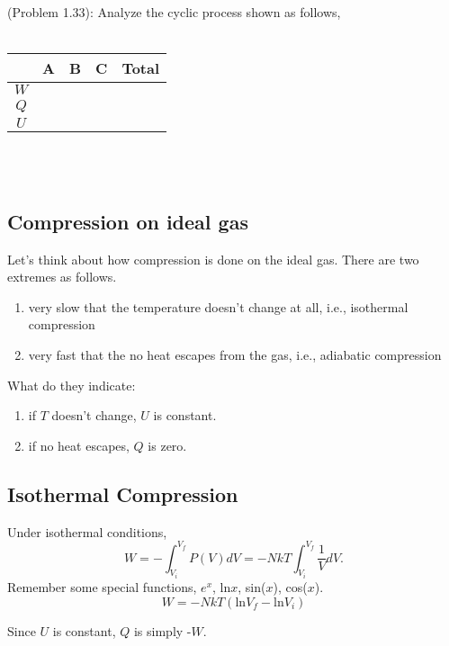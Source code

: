 (Problem 1.33):
Analyze the cyclic process shown as follows,\\\\

\begin{tabular}{|c | c | c | c | c |}
\hline
    & A & B & C & Total \\\hline
$W$ &   &   &   &\\\hline
$Q$ &   &   &   &\\\hline
$U$ &   &   &   &\\\hline
\end{tabular}\\\\


\subsection{Compression on ideal gas}
Let's think about how compression is done on the ideal gas. There are two extremes as follows.
\begin{enumerate}
\item{very slow that the temperature doesn't change at all, i.e., isothermal compression}
\item{very fast that the no heat escapes from the gas, i.e., adiabatic compression}
\end{enumerate}
What do they indicate:
\begin{enumerate}
\item{if $T$ doesn't change, $U$ is constant.}
\item{if no heat escapes, $Q$ is zero.}
\end{enumerate}

\subsection{Isothermal Compression}
Under isothermal conditions,
\begin{equation} \label{isot} 
 W = -\int_{V_{i}}^{V_{f}} P(V)dV = -NkT \int_{V_{i}}^{V_{f}} \frac{1}{V}dV.
\end{equation}
Remember some special functions, $e^x$, ln$x$, sin($x$), cos($x$).
\begin{equation} \label{isot} 
 W = -NkT(\textrm{ln}V_f - \textrm{ln}V_i)
\end{equation}

Since $U$ is constant, $Q$ is simply -$W$.


